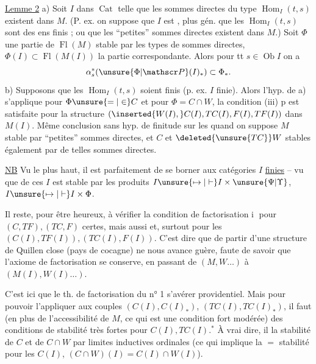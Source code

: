 \uline{Lemme 2}\unsure{,} a) Soit $I$ dans $\operatorname{Cat}$ telle que les sommes directes du type $\operatorname{Hom}_{I}(t,s)$ existent dans $M$. (P. ex. on suppose que $I$ est \uline{}, plus gén. que les $\operatorname{Hom}_{I}(t,s)$   sont des ens finis ; ou que les ``petites'' sommes directes existent dans $M$.) Soit $\Phi$ une partie de $\operatorname{Fl}(M)$ stable par les types de sommes directes,   $\Phi(I)\subset\operatorname{Fl}(M(I))$ la partie correspondante. Alors pour tt $s\in\operatorname{Ob} I$ on a
\[
 \alpha_{s}^{*}(\unsure{\Phi|\mathscr P}(I)_{*})\subset\Phi_{*}.
\]
b) Supposons que les $\operatorname{Hom}_{I}(t,s)$ soient finis (p. ex. $I$ finie). Alors  l'hyp. de a) s'applique pour $\Phi\unsure{=|\in}C$ et pour $\Phi=C\cap W$,   la  condition (iii) p  est satisfaite pour la structure $(\inserted{W(I),}C(I),TC(I),F(I),TF(I))$ dans $M(I)$. Même conclusion sans hyp. de finitude sur les   quand on suppose $M$ stable par ``petites'' sommes directes, et $C$ et $\deleted{\unsure{TC}}W$ stables également par de telles sommes directes.

\uline{NB} Vu le  plus haut, il est parfaitement  de se borner  aux catégories $I$ \uline{finies} -- vu que   de ces $I$ est stable par les produits $I\unsure{\mapsto|\vdash}I\times\unsure{\Psi|\Upsilon}$, $I\unsure{\mapsto|\vdash}I\times\Phi$.

Il reste, pour être heureux, à vérifier la condition de factorisation \textcircled{\scriptsize i} pour $(C,TF),(TC,F)$ certes, mais aussi et, surtout pour les $(C(I),TF(I)),(TC(I),F(I))$. C'est dire que de partir  d'une structure de Quillen close (pays de cocagne)
ne nous avance guère,  faute de savoir que l'axiome de factorisation se conserve, en passant de $(M,W\ldots)$ à $(M(I),W(I)\ldots)$.

C'est ici que le th. de factorisation du n° 1  s'avérer providentiel. Mais pour pouvoir l'appliquer aux couples $(C(I),C(I)_{*})$, $(TC(I),TC(I)_{*})$, il faut (en plus de l'accessibilité de $M$, ce qui est une condition fort modérée) des conditions de stabilité très fortes pour $C(I),TC(I)$.$^{*}$
À vrai dire, il  la stabilité de $C$ et de $C\cap W$ par limites inductives ordinales (ce qui implique la $=$ stabilité pour les $C(I)$,  $(C\cap W)(I)=C(I)\cap W(I)$).

